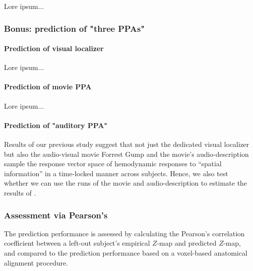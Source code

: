 Lore ipsum...


\subsubsection{Bonus: prediction of "three PPAs"}

\paragraph{Prediction of visual localizer}

Lore ipsum...

\paragraph{Prediction of movie PPA}

Lore ipsum...

\paragraph{Prediction of "auditory PPA"}


%
Results of our previous study \citep{haeusler2022processing} suggest that not
just the dedicated visual localizer \citep{sengupta2016extension} but also the
audio-visual movie Forrest Gump \citep{hanke2016simultaneous} and the movie's
audio-description \citep{hanke2014audiomovie} sample the response vector space
of hemodynamic responses to ``spatial information'' in a time-locked manner
across subjects.
%
Hence, we also test whether we can use the runs of the movie and
audio-description to estimate the results of \citet{haeusler2022processing}.



\subsubsection{Assessment via Pearson's}


%
The prediction performance is assessed by calculating the Pearson's correlation
coefficient between a left-out subject's empirical $Z$-map and predicted
$Z$-map, and compared to the prediction performance based on a voxel-based
anatomical alignment procedure.


